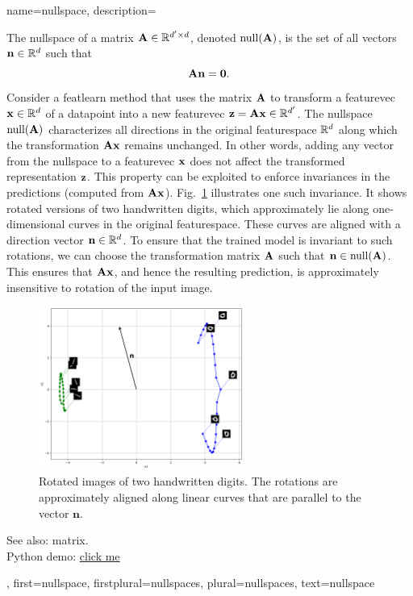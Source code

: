 {name={nullspace},
 description={
	The nullspace  of a \gls{matrix} ${\bf A} \in \mathbb{R}^{d' \times d}$, 
    denoted ${\rm null}({\bf A})$, is the set of all \glspl{vector} $\mathbf{n} \in \mathbb{R}^d$ 
    such that $${\bf A} \mathbf{n} = \mathbf{0}.$$ 
	Consider a \gls{featlearn} method that uses the \gls{matrix} ${\bf A}$ to transform 
	a \gls{featurevec} $\mathbf{x} \in \mathbb{R}^{d}$ of a \gls{datapoint} 
	into a new \gls{featurevec} ${\bf z} = {\bf A} \mathbf{x} \in \mathbb{R}^{d'}$. 
	The nullspace ${\rm null}({\bf A})$ characterizes all directions in the original 
    \gls{featurespace} $\mathbb{R}^{d}$ along which the transformation 
	${\bf A} \mathbf{x}$ remains unchanged. In other words, adding any \gls{vector} from 
	the nullspace to a \gls{featurevec} ${\bf x}$ does not affect the transformed 
	representation ${\bf z}$. This property can be exploited to enforce invariances in the 
	\glspl{prediction} (computed from ${\bf A} \mathbf{x}$). Fig.\ \ref{fig:nullspace-rotation-dict} 
	illustrates one such invariance. It shows rotated versions of two handwritten digits, 
	which approximately lie along one-dimensional curves in the original \gls{featurespace}. 
	These curves are aligned with a direction \gls{vector} $\mathbf{n} \in \mathbb{R}^{d}$. 
    To ensure that the trained \gls{model} is invariant to such rotations, we can 
	choose the transformation \gls{matrix} ${\bf A}$ such that $\mathbf{n} \in {\rm null}({\bf A})$. 
	This ensures that ${\bf A} \mathbf{x}$, and hence the resulting \gls{prediction}, 
	is approximately insensitive to rotation of the input image.
		\begin{figure}[h]
      \centering
      \includegraphics[width=0.6\textwidth]{assets/pythonsnacks/nullspace_0_1.png}
	  \caption{Rotated images of two handwritten digits. The rotations are approximately 
	  aligned along linear curves that are parallel to the \gls{vector} $\mathbf{n}$.\label{fig:nullspace-rotation-dict}}	
	       \end{figure}
		See also: \gls{matrix}. \\ 
		Python demo: \href{https://github.com/AaltoDictionaryofML/AaltoDictionaryofML.github.io/blob/main/assets/pythonsnacks/nullspace.py}{click me}},
 	first={nullspace},
 	firstplural={nullspaces},
 	plural={nullspaces},
 	text={nullspace}
}

